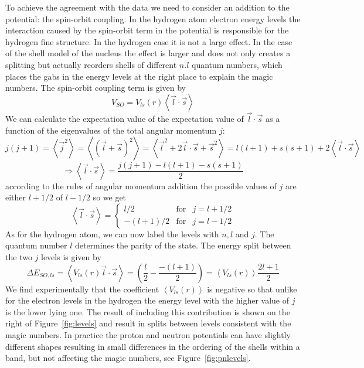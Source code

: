 \documentclass[12pt]{article}
\begin{document}
To achieve the agreement with the data we need to consider an addition to the potential: the spin-orbit coupling. In the hydrogen atom electron energy levels the interaction caused by the spin-orbit term in the potential is responsible for the hydrogen fine structure. In the hydrogen case it is not a large effect. In the case of the shell model of the nucleus the effect is larger and does not only creates a splitting but actually reorders shells of different $n.l$ quantum numbers, which places the gabs in the energy levels at the right place to explain the magic numbers. The spin-orbit coupling term is given by 
\[V_{SO}=V_{ls}(r)\left<\vec{l}\cdot\vec{s}\right>\] 
We can calculate the expectation value of the expectation value of $\vec{l}\cdot\vec{s}$ as a function of the eigenvalues of the total angular momentum $j$:
\[
j(j+1)=\left<\vec{j}^2\right>=\left<(\vec{l}+\vec{s})^2\right>
=
\left<\vec{l}^2+2\vec{l}\cdot\vec{s}+\vec{s}^2\right>
=l(l+1)+s(s+1)+2\left<\vec{l}\cdot\vec{s}\right>
\]
\[\Rightarrow
\left<\vec{l}\cdot\vec{s}\right>=\frac{j(j+1)-l(l+1)-s(s+1)}{2}
\]
according to the rules of angular momentum addition the possible values of $j$ are either $l+1/2$ of $l-1/2$ so we get
\[\left<\vec{l}\cdot\vec{s}\right>=\left\{\begin{array}{rcc}
l/2&\mbox{for}& j=l+1/2\\
-(l+1)/2&\mbox{for}& j=l-1/2
\end{array}\right.\]
As for the hydrogen atom, we can now label the levels with $n,l$ and $j$. The quantum number $l$ determines the parity of the state. The energy split between the two $j$ levels is given by
\[
\Delta E_{SO,ls}=\left<V_{ls}(r) \vec{l}\cdot\vec{s}\right>=
\left(\frac{l}{2}-\frac{-(l+1)}{2}\right)=\left<V_{ls}(r)\right>\frac{2l+1}{2}
\]
We find experimentally that the coefficient $\left<V_{ls}(r)\right>$ is negative so that unlike for the electron levels in the hydrogen the energy level with the higher value of $j$ is the lower lying one. The result of including this contribution is shown on the right of Figure~\ref{fig:levels} and result in splits between levels consistent with the magic numbers. 
In practice the proton and neutron potentials can have slightly different shapes resulting in small differences in the ordering of the shells within a band, but not affecting the magic numbers, see Figure~\ref{fig:pnlevels}. 
\end{document}
